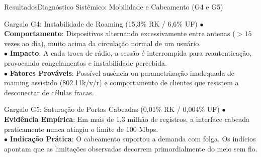 \documentclass[10pt,brazil]{beamer}
\begin{document}
    \begin{frame}[label=slide_gargalos_roaming_cabo]{Resultados}{Diagnóstico Sistêmico: Mobilidade e Cabeamento (G4 e G5)}
        \begin{block}{Gargalo G4: Instabilidade de Roaming (15,3\% RK / 6,6\% UF)}
            \scriptsize
            $\bullet$ \textbf{Comportamento}: Dispositivos alternando excessivamente entre antenas ($> 15$ vezes ao dia), muito acima da circulação normal de um usuário.\\
            $\bullet$ \textbf{Impacto}: A cada troca de rádio, a sessão é interrompida para reautenticação, provocando congelamentos e instabilidade percebida.\\
            $\bullet$ \textbf{Fatores Prováveis}: Possível ausência ou parametrização inadequada de roaming assistido (802.11k/v/r) e comportamento de clientes que resistem a desconectar de células fracas.
        \end{block}
        
        \begin{block}{Gargalo G5: Saturação de Portas Cabeadas (0,01\% RK / 0,004\% UF)}
            \scriptsize
            $\bullet$ \textbf{Evidência Empírica}: Em mais de 1,3 milhão de registros, a interface cabeada praticamente nunca atingiu o limite de 100 Mbps.\\
            $\bullet$ \textbf{Indicação Prática}: O cabeamento suportou a demanda com folga. Os indícios apontam que as limitações observadas decorrem primordialmente do meio sem fio.
        \end{block}
    \end{frame}
\end{document}
